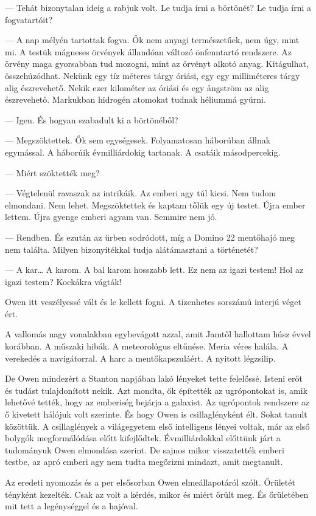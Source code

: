 \documentclass[10pt]{memoir}
\begin{document}
— Tehát bizonytalan ideig a rabjuk volt. Le tudja írni a börtönét? Le tudja
írni a fogvatartóit?

— A nap mélyén tartottak fogva. Ők nem anyagi természetűek, nem úgy, mint mi. A
testük mágneses örvények állandóan változó önfenntartó rendszere. Az örvény
maga gyorsabban tud mozogni, mint az örvényt alkotó anyag. Kitágulhat,
összehúzódhat. Nekünk egy tíz méteres tárgy óriási, egy egy milliméteres tárgy
alig észrevehető. Nekik ezer kilométer az óriási és egy ångström az alig
észrevehető. Markukban hidrogén atomokat tudnak héliummá gyúrni.

— Igen. És hogyan szabadult ki a börtönéből?

— Megszöktettek. Ők sem egységesek. Folyamatosan háborúban állnak egymással. A
háborúik évmilliárdokig tartanak. A csatáik másodpercekig.

— Miért szöktették meg?

— Végtelenül ravaszak az intrikáik. Az emberi agy túl kicsi. Nem tudom
elmondani. Nem lehet. Megszöktettek és kaptam tőlük egy új testet. Újra ember
lettem. Újra gyenge emberi agyam van. Semmire nem jó.

— Rendben. És ezután az űrben sodródott, míg a Domino 22 mentőhajó meg nem
találta. Milyen bizonyítékkal tudja alátámasztani a történetét?

— A kar… A karom. A bal karom hosszabb lett. Ez nem az igazi testem! Hol az
igazi testem? Kockákra vágták!

Owen itt veszélyessé vált és le kellett fogni. A tizenhetes sorszámú interjú
véget ért.

A vallomás nagy vonalakban egybevágott azzal, amit Jamtől hallottam húsz évvel
korábban. A műszaki hibák. A meteorológus eltűnése. Meria véres halála. A
verekedés a navigátorral. A harc a mentőkapszuláért. A nyitott légzsilip.

De Owen mindezért a Stanton napjában lakó lényeket tette felelőssé. Isteni erőt
és tudást tulajdonított nekik. Azt mondta, ők építették az ugrópontokat is,
amik lehetővé tették, hogy az emberiség bejárja a galaxist. Az ugrópontok
rendszere az ő kivetett hálójuk volt szerinte. És hogy Owen is csillaglényként
élt. Sokat tanult közöttük. A csillaglények a világegyetem első intelligens
lényei voltak, már az első bolygók megformálódása előtt kifejlődtek.
Évmilliárdokkal előttünk járt a tudományuk Owen elmondása szerint. De sajnos
mikor visszatették emberi testbe, az apró emberi agy nem tudta megőrizni
mindazt, amit megtanult.

Az eredeti nyomozás és a per elsősorban Owen elmeállapotáról szólt. Őrületét
tényként kezelték. Csak az volt a kérdés, mikor és miért őrült meg. És
őrületében mit tett a legénységgel és a hajóval.
\end{document}
